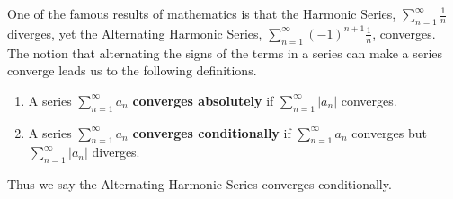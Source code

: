 \documentclass[10pt]{article}
\newcommand{\ds}{\displaystyle}
\newcommand{\sword}[1]{\textbf{#1}}
\begin{document}

One of the famous results of mathematics is that the Harmonic Series, $\ds \sum_{n=1}^\infty \frac1n$ diverges, yet the Alternating Harmonic Series, $\ds \sum_{n=1}^\infty (-1)^{n+1}\frac1n$, converges. The notion that alternating the signs of the terms in a series can make a series converge leads us to the following definitions.

{
\begin{enumerate}
	\item A series $\ds \sum_{n=1}^\infty a_n$ \sword{converges absolutely} if $\ds \sum_{n=1}^\infty |a_n|$ converges.
	\item A series $\ds \sum_{n=1}^\infty a_n$ \sword{converges conditionally} if $\ds \sum_{n=1}^\infty a_n$ converges but $\ds \sum_{n=1}^\infty |a_n|$ diverges.
\end{enumerate}
}


Thus we say the Alternating Harmonic Series converges conditionally. \\
\end{document}
